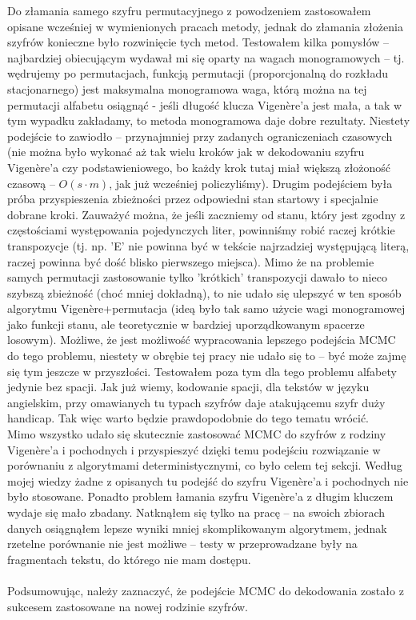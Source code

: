 \documentclass[a4paper]{article}
\theoremstyle{defn}
\theoremstyle{theorem}
\theoremstyle{lemma}
\theoremstyle{cor}
\theoremstyle{fact}
\begin{document}
Do złamania samego szyfru permutacyjnego z powodzeniem zastosowałem opisane wcześniej w wymienionych pracach metody, jednak do złamania złożenia szyfrów konieczne było rozwinięcie tych metod. Testowałem kilka pomysłów – najbardziej obiecującym wydawał mi się oparty na wagach monogramowych – tj. wędrujemy po permutacjach, funkcją permutacji (proporcjonalną do rozkładu stacjonarnego) jest maksymalna monogramowa waga, którą można na tej permutacji alfabetu osiągnąć - jeśli długość klucza Vigenère'a jest mała, a tak w tym wypadku zakładamy, to metoda monogramowa daje dobre rezultaty. Niestety podejście to zawiodło – przynajmniej przy zadanych ograniczeniach czasowych (nie można było wykonać aż tak wielu kroków jak w dekodowaniu szyfru Vigenère'a czy podstawieniowego, bo każdy krok tutaj miał większą złożoność czasową – $O(s \cdot m)$, jak już wcześniej policzyliśmy). Drugim podejściem była próba przyspieszenia zbieżności przez odpowiedni stan startowy i specjalnie dobrane kroki. Zauważyć można, że jeśli zaczniemy od stanu, który jest zgodny z częstościami występowania pojedynczych liter, powinniśmy robić raczej krótkie transpozycje (tj. np. 'E' nie powinna być w tekście najrzadziej występującą literą, raczej powinna być dość blisko pierwszego miejsca). Mimo że na problemie samych permutacji zastosowanie tylko 'krótkich' transpozycji dawało to nieco szybszą zbieżność (choć mniej dokładną), to nie udało się ulepszyć w ten sposób algorytmu Vigenère+permutacja (ideą było tak samo użycie wagi monogramowej jako funkcji stanu, ale teoretycznie w bardziej uporządkowanym spacerze losowym). Możliwe, że jest możliwość wypracowania lepszego podejścia MCMC do tego problemu, niestety w obrębie tej pracy nie udało się to – być może zajmę się tym jeszcze w przyszłości. Testowałem poza tym dla tego problemu alfabety jedynie bez spacji. Jak już wiemy, kodowanie spacji, dla tekstów w języku angielskim, przy omawianych tu typach szyfrów daje atakującemu szyfr duży handicap. Tak więc warto będzie prawdopodobnie do tego tematu wrócić.
\\
Mimo wszystko udało się  skutecznie zastosować MCMC do szyfrów z rodziny Vigenère'a i pochodnych i przyspieszyć dzięki temu podejściu rozwiązanie w porównaniu z algorytmami deterministycznymi, co było celem tej sekcji. Według mojej wiedzy żadne z opisanych tu podejść do szyfru Vigenère'a i pochodnych nie było stosowane. Ponadto problem łamania szyfru Vigenère'a z długim kluczem wydaje się mało zbadany. Natknąłem się tylko na pracę \cite{other} – na swoich zbiorach danych osiągnąłem lepsze wyniki mniej skomplikowanym algorytmem, jednak rzetelne porównanie nie jest możliwe – testy w \cite{other} przeprowadzane były na fragmentach tekstu, do którego nie mam dostępu. \\\\
Podsumowując, należy zaznaczyć, że podejście MCMC do dekodowania zostało z sukcesem zastosowane na nowej rodzinie szyfrów.
\newpage
\end{document}
